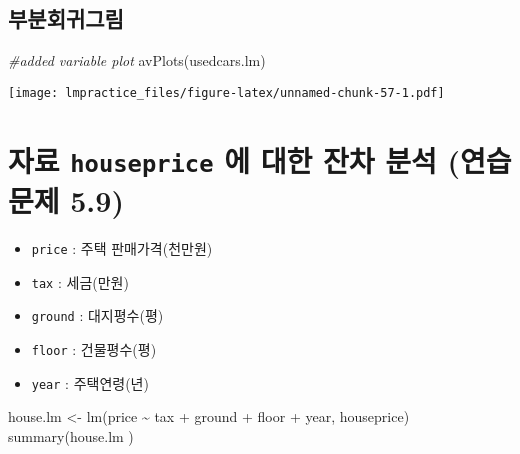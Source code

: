 \documentclass[
]{book}
\newenvironment{Shaded}{\begin{snugshade}}{\end{snugshade}}
\newcommand{\CommentTok}[1]{\textcolor[rgb]{0.56,0.35,0.01}{\textit{#1}}}
\newcommand{\FunctionTok}[1]{\textcolor[rgb]{0.00,0.00,0.00}{#1}}
\newcommand{\NormalTok}[1]{#1}
\newcommand{\OtherTok}[1]{\textcolor[rgb]{0.56,0.35,0.01}{#1}}
\newcommand{\SpecialCharTok}[1]{\textcolor[rgb]{0.00,0.00,0.00}{#1}}
\providecommand{\tightlist}{%
  \setlength{\itemsep}{0pt}\setlength{\parskip}{0pt}}
\begin{document}
\hypertarget{uxbd80uxbd84uxd68cuxadc0uxadf8uxb9bc}{%
\subsection{부분회귀그림}\label{uxbd80uxbd84uxd68cuxadc0uxadf8uxb9bc}}

\begin{Shaded}
\begin{Highlighting}[]
\CommentTok{\#added variable plot}
\FunctionTok{avPlots}\NormalTok{(usedcars.lm)}
\end{Highlighting}
\end{Shaded}

\texttt{[image: lmpractice\_files/figure-latex/unnamed-chunk-57-1.pdf]}

\hypertarget{uxc790uxb8cc-houseprice-uxc5d0-uxb300uxd55c-uxc794uxcc28-uxbd84uxc11d-uxc5f0uxc2b5uxbb38uxc81c-5.9}{%
\section{\texorpdfstring{자료 \texttt{houseprice} 에 대한 잔차 분석 (연습문제 5.9)}{자료 houseprice 에 대한 잔차 분석 (연습문제 5.9)}}\label{uxc790uxb8cc-houseprice-uxc5d0-uxb300uxd55c-uxc794uxcc28-uxbd84uxc11d-uxc5f0uxc2b5uxbb38uxc81c-5.9}}

\begin{itemize}
\tightlist
\item
  \texttt{price} : 주택 판매가격(천만원)
\item
  \texttt{tax} : 세금(만원)
\item
  \texttt{ground} : 대지평수(평)
\item
  \texttt{floor} : 건물평수(평)
\item
  \texttt{year} : 주택연령(년)
\end{itemize}

\begin{Shaded}
\begin{Highlighting}[]
\NormalTok{house.lm }\OtherTok{\textless{}{-}} \FunctionTok{lm}\NormalTok{(price }\SpecialCharTok{\textasciitilde{}}\NormalTok{ tax }\SpecialCharTok{+}\NormalTok{ ground }\SpecialCharTok{+}\NormalTok{ floor }\SpecialCharTok{+}\NormalTok{ year, houseprice)}
\FunctionTok{summary}\NormalTok{(house.lm )}
\end{Highlighting}
\end{Shaded}
\end{document}
